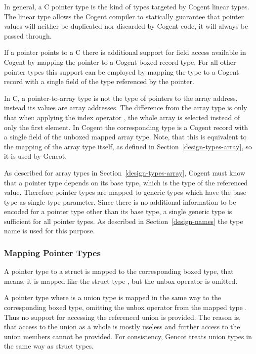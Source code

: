 In general, a C pointer type  is the kind of types targeted by Cogent linear types. The linear type 
allows the Cogent compiler to statically guarantee that pointer values will neither be duplicated nor 
discarded by Cogent code, it will always be passed through. 

If a pointer points to a C  there is additional support for field access available in Cogent by 
mapping the pointer to a Cogent boxed record type. For all other pointer types this support can be employed by
mapping the type to a Cogent record with a single field of the type referenced by the pointer.

In C, a pointer-to-array type is not the type of pointers to the array address, instead its values are array addresses.
The difference from the array type is only that when applying the index operator \code{[]}, the whole array is
selected instead of only the first element. In Cogent the corresponding type is a Cogent record with a single
field of the unboxed mapped array type. Note, that this is equivalent to the mapping of the array type itself, as defined
in Section~\ref{design-types-array}, so it is used by Gencot.

As described for array types in Section~\ref{design-types-array}, Cogent must know that a pointer type depends on 
its base type, which is the type of the referenced value. Therefore pointer types are mapped to generic types which
have the base type as single type parameter. Since there is no additional information to be encoded for a pointer
type other than its base type, a single generic type is sufficient for all pointer types. As described in 
Section~\ref{design-names} the type name  is used for this purpose.

\subsubsection{Mapping Pointer Types}

A pointer type  to a struct is mapped to the corresponding boxed type, 
that means, it is mapped like the struct type , but the unbox operator is omitted.

A pointer type  where  is a union type is mapped in the same way to the corresponding
boxed type, omitting the unbox operator from the mapped type . Thus no support for accessing
the referenced union is provided. The reason is, that access to the union as a whole is mostly useless
and further access to the union members cannot be provided. For consistency, Gencot treats union types
in the same way as struct types.

